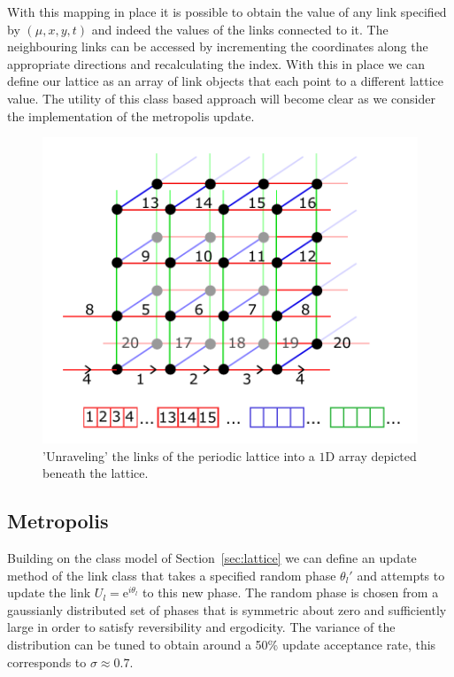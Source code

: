 \documentclass[12pt]{article}
\begin{document}
\par With this mapping in place it is possible to obtain the value of any link specified by $(\mu,x,y,t)$ and indeed the values of the links connected to it. The neighbouring links can be accessed by incrementing the coordinates along the appropriate directions and recalculating the index. With this in place we can define our lattice as an array of link objects that each point to a different lattice value. The utility of this class based approach will become clear as we consider the implementation of the metropolis update.

%



\begin{figure}
\centering
\includegraphics[width=0.6\linewidth]{latticeunpack.pdf}
\caption{'Unraveling' the links of the periodic lattice into a $1\mathrm{D}$ array depicted beneath the lattice.}
\label{fig:latticeunpack}
\end{figure}

\subsection{Metropolis}
Building on the class model of Section~\ref{sec:lattice} we can define an update method of the link class that takes a specified random phase $\theta_l'$ and attempts to update the link $U_l = \mathrm{e}^{i\theta_l}$ to this new phase. The random phase is chosen from a gaussianly distributed set of phases that is symmetric about zero and sufficiently large in order to satisfy reversibility and ergodicity. The variance of the distribution can be tuned to obtain around a 50\% update acceptance rate, this corresponds to $\sigma \approx 0.7$.
\end{document}
